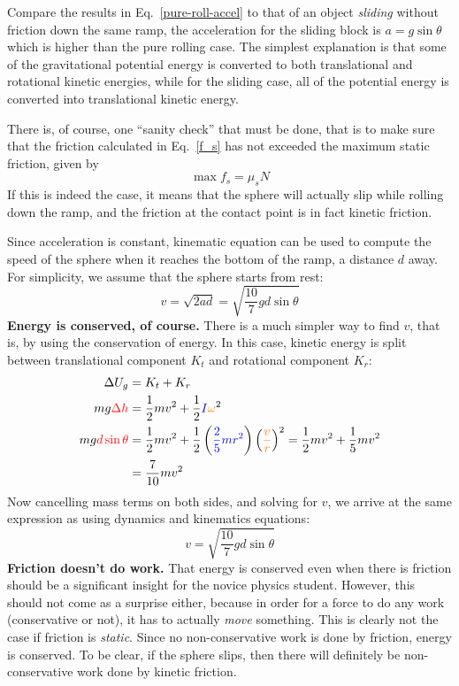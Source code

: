 \documentclass[11pt]{article}
\begin{document}
Compare the results in Eq.~\ref{pure-roll-accel} to that of an object
\emph{sliding} without friction down the same ramp, the acceleration for the
sliding block is $a=g\sin\theta$ which is higher than the pure rolling case.
The simplest explanation is that some of the gravitational potential energy is
converted to both translational and rotational kinetic energies, while for the
sliding case, all of the potential energy is converted into translational
kinetic energy.

There is, of course, one ``sanity check'' that must be done, that is to make
sure that the friction calculated in Eq.~\ref{f_s} has not exceeded the maximum
static friction, given by
\begin{equation}
  \max f_s=\mu_s N
\end{equation}
If this is indeed the case, it means that the sphere will actually slip while
rolling down the ramp, and the friction at the contact point is in fact kinetic
friction.

Since acceleration is constant, kinematic equation can be used to compute the
speed of the sphere when it reaches the bottom of the ramp, a distance $d$ away.
For simplicity, we assume that the sphere starts from rest:
\begin{equation}
  v=\sqrt{2ad}=\sqrt{\frac{10}{7}gd\sin\theta}
\end{equation}
\textbf{Energy is conserved, of course.} There is a much simpler way to find
$v$, that is, by using the conservation of energy. In this case, kinetic energy
is split between translational component $K_t$ and rotational component $K_r$:
\begin{align*}
  \Delta U_g&=K_t+K_r\\
  mg\textcolor{red}{\Delta h}&=\frac12 mv^2+
  \frac12
  \textcolor{blue}{I}\textcolor{orange}{\omega}^2\\
  mg\textcolor{red}{d\sin\theta}&=\frac12 mv^2+\frac12
  \left(\textcolor{blue}{\frac25 mr^2}\right)
  \left(\textcolor{orange}{\frac{v}{r}}\right)^2
  =\frac12 mv^2+\frac15mv^2\\
  &=\frac{7}{10}mv^2
\end{align*}
Now cancelling mass terms on both sides, and solving for $v$, we arrive at the
same expression as using dynamics and kinematics equations:
\begin{equation}
  v=\sqrt{\frac{10}{7}gd\sin\theta}
\end{equation}
\textbf{Friction doesn't do work.} That energy is conserved even when there is
friction should be a significant insight for the novice physics student.
However, this should not come as a surprise either, because in order for a
force to do any work (conservative or not), it has to actually \emph{move}
something. This is clearly not the case if friction is \emph{static}. Since no
non-conservative work is done by friction, energy is conserved. To be clear, if
the sphere slips, then there will definitely be non-conservative work done by
kinetic friction.
\end{document}
